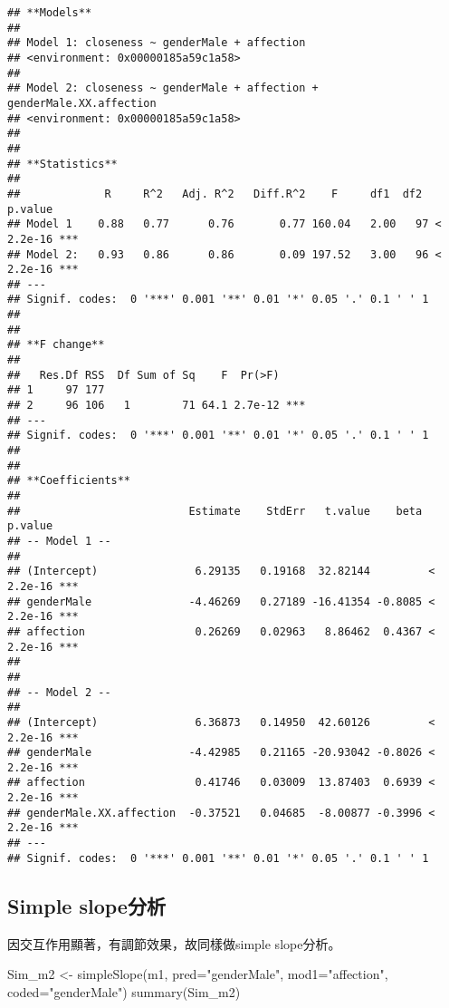 \documentclass[
]{book}
\newenvironment{Shaded}{\begin{snugshade}}{\end{snugshade}}
\newcommand{\AttributeTok}[1]{\textcolor[rgb]{0.77,0.63,0.00}{#1}}
\newcommand{\FunctionTok}[1]{\textcolor[rgb]{0.00,0.00,0.00}{#1}}
\newcommand{\NormalTok}[1]{#1}
\newcommand{\OtherTok}[1]{\textcolor[rgb]{0.56,0.35,0.01}{#1}}
\newcommand{\StringTok}[1]{\textcolor[rgb]{0.31,0.60,0.02}{#1}}
\begin{document}
\begin{verbatim}
## **Models**
## 
## Model 1: closeness ~ genderMale + affection
## <environment: 0x00000185a59c1a58>
## 
## Model 2: closeness ~ genderMale + affection + genderMale.XX.affection
## <environment: 0x00000185a59c1a58>
## 
## 
## **Statistics**
## 
##             R     R^2   Adj. R^2   Diff.R^2    F     df1  df2    p.value    
## Model 1    0.88   0.77      0.76       0.77 160.04   2.00   97 < 2.2e-16 ***
## Model 2:   0.93   0.86      0.86       0.09 197.52   3.00   96 < 2.2e-16 ***
## ---
## Signif. codes:  0 '***' 0.001 '**' 0.01 '*' 0.05 '.' 0.1 ' ' 1
## 
## 
## **F change**
## 
##   Res.Df RSS  Df Sum of Sq    F  Pr(>F)    
## 1     97 177                               
## 2     96 106   1        71 64.1 2.7e-12 ***
## ---
## Signif. codes:  0 '***' 0.001 '**' 0.01 '*' 0.05 '.' 0.1 ' ' 1
## 
## 
## **Coefficients**
## 
##                          Estimate    StdErr   t.value    beta   p.value    
## -- Model 1 --                                                              
##                                                                            
## (Intercept)               6.29135   0.19168  32.82144         < 2.2e-16 ***
## genderMale               -4.46269   0.27189 -16.41354 -0.8085 < 2.2e-16 ***
## affection                 0.26269   0.02963   8.86462  0.4367 < 2.2e-16 ***
##                                                                            
##                                                                            
## -- Model 2 --                                                              
##                                                                            
## (Intercept)               6.36873   0.14950  42.60126         < 2.2e-16 ***
## genderMale               -4.42985   0.21165 -20.93042 -0.8026 < 2.2e-16 ***
## affection                 0.41746   0.03009  13.87403  0.6939 < 2.2e-16 ***
## genderMale.XX.affection  -0.37521   0.04685  -8.00877 -0.3996 < 2.2e-16 ***
## ---
## Signif. codes:  0 '***' 0.001 '**' 0.01 '*' 0.05 '.' 0.1 ' ' 1
\end{verbatim}

\hypertarget{simple-slopeux5206ux6790-1}{%
\subsection{Simple slope分析}\label{simple-slopeux5206ux6790-1}}

因交互作用顯著，有調節效果，故同樣做simple slope分析。

\begin{Shaded}
\begin{Highlighting}[]
\NormalTok{Sim\_m2 }\OtherTok{\textless{}{-}} \FunctionTok{simpleSlope}\NormalTok{(m1, }\AttributeTok{pred=}\StringTok{"genderMale"}\NormalTok{, }\AttributeTok{mod1=}\StringTok{"affection"}\NormalTok{, }\AttributeTok{coded=}\StringTok{"genderMale"}\NormalTok{)}
\FunctionTok{summary}\NormalTok{(Sim\_m2)}
\end{Highlighting}
\end{Shaded}
\end{document}
